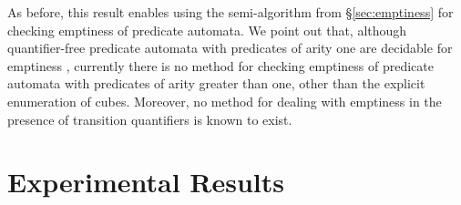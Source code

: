 As before, this result enables using the
semi-algorithm from \S\ref{sec:emptiness} for checking emptiness of
predicate automata.  We point out that, although quantifier-free
predicate automata with predicates of arity one are decidable for
emptiness \cite{Farzan15}, currently there is no method for checking
emptiness of predicate automata with predicates of arity greater than
one, other than the explicit enumeration of cubes. Moreover, no method
for dealing with emptiness in the presence of transition quantifiers
is known to exist.
\fi

\section{Experimental Results}
